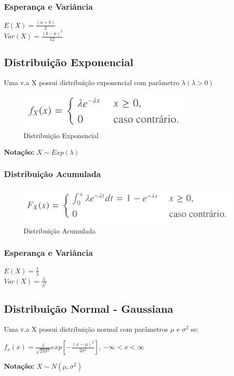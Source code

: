 \documentclass[a4paper, 12pt]{article}
\begin{document}
\subsubsection{Esperança e Variância}
	\begin{center}
		\Large
		$
		E(X) = \frac{(a + b )}{2}
		$\\
		$
		Var(X) = \frac{(b-a)^2}{12}
		$
	\end{center}
	
\subsection{Distribuição Exponencial}
	Uma v.a X possui distribuição exponencial com parâmetro $\lambda (\lambda>0)$
	\newpage
	\begin{figure}[h]
		\centering
		\includegraphics[width=0.5\linewidth]{imagens/eq4}
		\caption{Distribuição Exponencial}
		\label{fig:eq4}
	\end{figure}
	\textbf{Notação:} $X \sim Exp(\lambda)$
	
\subsubsection{Distribuição Acumulada}
	\begin{figure}[h]
		\centering
		\includegraphics[width=0.5\linewidth]{imagens/eq5}
		\caption{Distribuição Acumulada}
		\label{fig:eq5}
	\end{figure}
	
\subsubsection{Esperança e Variância}
	\begin{center}
		\Large
		$
		E(X) = \frac{1}{\lambda}
		$\\
		$Var(X) = \frac{1}{\lambda ^2}$
	\end{center}

\subsection{Distribuição Normal - Gaussiana}	
	Uma v.a X possui distribuição normal com parâmetros $\mu$ e $\sigma ^2$ se:
	\begin{center}
		\Large	
		$
		f_{x}(x) = \frac{1}{\sqrt{2\pi \sigma ^2}}exp[-\frac{(x-\mu)^2}{2\sigma ^2}]
		$, $
		-\infty<x<\infty
		$
	\end{center}
	\textbf{Notação:} $X \sim N(\mu, \sigma^2)$
\end{document}
